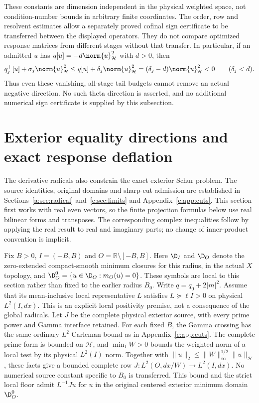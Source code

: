 \documentclass[11pt,a4paper]{article}
\numberwithin{equation}{section}
\theoremstyle{definition}\newtheorem{definition}[theorem]{Definition}
\theoremstyle{remark}\newtheorem{remark}[theorem]{Remark}
\newcommand{\R}{\mathbb R}\newcommand{\C}{\mathbb C}\newcommand{\N}{\mathbb N}
\newcommand{\Hh}{\mathcal H}\newcommand{\Hw}{\mathcal H}
\begin{document}
These constants are dimension independent in the physical weighted
space, not condition-number bounds in arbitrary finite coordinates.
The order, row and resolvent estimates allow a separately proved
cofinal sign certificate to be transferred between the displayed
operators.  They do not compare optimized response matrices from
different stages without that transfer.  In particular, if an admitted
$u$ has $q[u]=-d\norm{u}_{\Hh}^2$ with $d>0$, then
\[
 q_j^+[u]+\sigma_j\norm{u}_{\Hh}^2
 \le q[u]+\delta_j\norm{u}_{\Hh}^2
 =(\delta_j-d)\norm{u}_{\Hh}^2<0
 \qquad(\delta_j<d).
\]
Thus even these vanishing, all-stage tail budgets cannot remove an
actual negative direction.  No such theta direction is asserted, and
no additional numerical sign certificate is supplied by this subsection.


\section{Exterior equality directions and exact response deflation}\label{ext:sec:exterior}
The derivative radicals also constrain the exact exterior Schur problem. The source identities, original domains and sharp-cut admission are established in Sections~\ref{a:sec:radical} and~\ref{c:sec:limits} and Appendix~\ref{c:app:cuts}. This section first works with real even vectors, so the finite projection formulas below use real bilinear forms and transposes. The corresponding complex inequalities follow by applying the real result to real and imaginary parts; no change of inner-product convention is implicit.

Fix $B>0$, $I=(-B,B)$ and $O=\R\setminus[-B,B]$. Here $\D_I$ and $\D_O$ denote the zero-extended compact-smooth minimum closures for this radius, in the actual $X$ topology, and $\D_O^0=\{u\in\D_O:m_O(u)=0\}$. These symbols are local to this section rather than fixed to the earlier radius $B_0$. Write $q=q_0+2|m|^2$. Assume that its mean-inclusive local representative $L$ satisfies $L\succeq\ell I>0$ on physical $L^2(I,dx)$. This is an explicit local positivity premise, not a consequence of the global radicals. Let $J$ be the complete physical exterior source, with every prime power and Gamma interface retained. For each fixed $B$, the Gamma crossing has the same ordinary-$L^2$ Carleman bound as in Appendix~\ref{c:app:cuts}. The complete prime form is bounded on $\Hh$, and $\min_I W>0$ bounds the weighted norm of a local test by its physical $L^2(I)$ norm. Together with $\|u\|_2\le\|W\|_\infty^{1/2}\|u\|_{\Hh}$, these facts give a bounded complete row $J:L^2(O,dx/W)\to L^2(I,dx)$. No numerical source constant specific to $B_0$ is transferred. This bound and the strict local floor admit $L^{-1}Ju$ for $u$ in the original centered exterior minimum domain $\D_O^0$.
\end{document}
